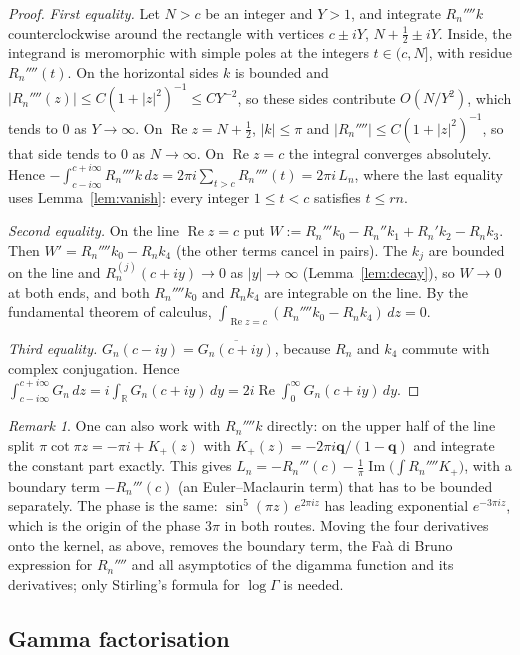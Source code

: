\documentclass[11pt]{amsart}
\theoremstyle{definition}
\theoremstyle{remark}
\newtheorem{remark}[theorem]{Remark}
\numberwithin{equation}{section}
\newcommand{\RR}{\mathbb{R}}
\renewcommand{\Re}{\operatorname{Re}}
\renewcommand{\Im}{\operatorname{Im}}
\begin{document}
\begin{proof}
\emph{First equality.} Let $N>c$ be an integer and $Y>1$, and integrate $R_n''''k$ counterclockwise around the
rectangle with vertices $c\pm iY$, $N+\frac12\pm iY$. Inside, the integrand is meromorphic with simple poles at
the integers $t\in(c,N]$, with residue $R_n''''(t)$. On the horizontal sides $k$ is bounded and
$|R_n''''(z)|\le C(1+|z|^2)^{-1}\le CY^{-2}$, so these sides contribute $O(N/Y^2)$, which tends to $0$ as
$Y\to\infty$. On $\Re z=N+\frac12$, $|k|\le\pi$ and $|R_n''''|\le C(1+|z|^2)^{-1}$, so that side tends to $0$ as
$N\to\infty$. On $\Re z=c$ the integral converges absolutely. Hence
$-\int_{c-i\infty}^{c+i\infty}R_n''''k\,dz=2\pi i\sum_{t>c}R_n''''(t)=2\pi i\,L_n$, where the last equality
uses Lemma~\ref{lem:vanish}: every integer $1\le t<c$ satisfies $t\le rn$.

\emph{Second equality.} On the line $\Re z=c$ put
$W:=R_n'''k_0-R_n''k_1+R_n'k_2-R_nk_3$. Then $W'=R_n''''k_0-R_nk_4$ (the other terms cancel in pairs). The $k_j$
are bounded on the line and $R_n^{(j)}(c+iy)\to0$ as $|y|\to\infty$ (Lemma~\ref{lem:decay}), so $W\to0$ at both
ends, and both $R_n''''k_0$ and $R_nk_4$ are integrable on the line. By the fundamental theorem of calculus,
$\int_{\Re z=c}(R_n''''k_0-R_nk_4)\,dz=0$.

\emph{Third equality.} $G_n(c-iy)=\overline{G_n(c+iy)}$, because $R_n$ and $k_4$ commute with complex conjugation.
Hence $\int_{c-i\infty}^{c+i\infty}G_n\,dz=i\int_\RR G_n(c+iy)\,dy=2i\Re\int_0^\infty G_n(c+iy)\,dy$.
\end{proof}

\begin{remark}\label{rem:split}
One can also work with $R_n''''k$ directly: on the upper half of the line split $\pi\cot\pi z=-\pi i+K_+(z)$ with
$K_+(z)=-2\pi i\mathbf q/(1-\mathbf q)$ and integrate the constant part exactly. This gives
$L_n=-R_n'''(c)-\frac1\pi\Im\bigl(\int R_n''''K_+\bigr)$, with a boundary term $-R_n'''(c)$ (an Euler--Maclaurin term)
that has to be bounded separately. The phase is the same: $\sin^5(\pi z)\,e^{2\pi iz}$ has leading exponential
$e^{-3\pi iz}$, which is the origin of the phase $3\pi$ in both routes. Moving the four
derivatives onto the kernel, as above, removes the boundary term, the Fa\`a di Bruno expression for $R_n''''$ and
all asymptotics of the digamma function and its derivatives; only Stirling's formula for $\log\Gamma$ is needed.
\end{remark}

\subsection{Gamma factorisation}
\end{document}
